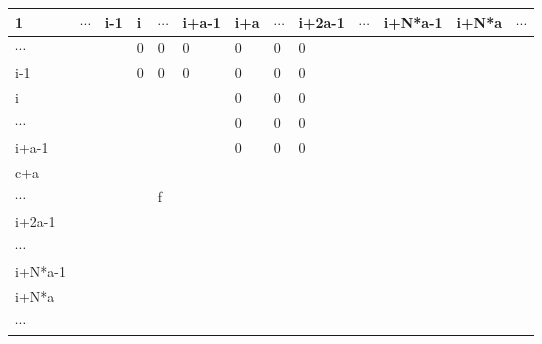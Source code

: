 \documentclass[a4paper,11pt]{article}
\begin{document}
\begin{center}
\begin{tabular}{p{15pt}|p{15pt}|p{15pt}||p{15pt}|p{15pt}
|p{15pt}||p{15pt}|p{15pt}|
p{15pt}|p{15pt}|p{15pt}|p{15pt}|p{15pt}| } 
 1 & $\cdots$ & i-1 & i & $\cdots$ & \tiny{i+a-1} & {\tiny i+a } 
& $\cdots$ & {\tiny{i+2a-1} }
& $\cdots$ & {\tiny i+N*a-1} & {\tiny i+N*a} & $\cdots$ \\
\hline
$\cdots$  & \cellcolor{green} & \cellcolor{green} & \cellcolor{sandstorm} 0 & \cellcolor{sandstorm} 0 & \cellcolor{sandstorm} 0 & \cellcolor{sandstorm} 0 & \cellcolor{sandstorm} 0 & \cellcolor{sandstorm} 0 &  &  &  & \\[10pt]
\hline
i-1 & \cellcolor{green} & \cellcolor{green} & \cellcolor{sandstorm} 0 & \cellcolor{sandstorm} 0 & \cellcolor{sandstorm} 0 & \cellcolor{sandstorm} 0 &\cellcolor{sandstorm} 0 & \cellcolor{sandstorm} 0 &  &  &  &  \\ [10pt]
\hline
i & \cellcolor{periwinkle} & \cellcolor{periwinkle} & \cellcolor{pink} & \cellcolor{pink} &\cellcolor{pink} & \cellcolor{sandstorm} 0 &
\cellcolor{sandstorm} 0 &
\cellcolor{sandstorm} 0 &&&& \\ [10pt]
\hline
$\cdots$ & \cellcolor{periwinkle} & \cellcolor{periwinkle}
&\cellcolor{pink} &\cellcolor{pink}&\cellcolor{pink} &
\cellcolor{sandstorm} 0 & \cellcolor{sandstorm} 0 &
\cellcolor{sandstorm} 0 &&&& \\ [10pt]
\hline
i+a-1 &\cellcolor{periwinkle} &\cellcolor{periwinkle} & \cellcolor{pink} & \cellcolor{pink} & \cellcolor{pink} 
& \cellcolor{sandstorm} 0 & \cellcolor{sandstorm} 0 
& \cellcolor{sandstorm} 0 &&&& \\ [10pt]
\hline \hline
{\scriptsize c+a }  & \cellcolor{periwinkle} & \cellcolor{periwinkle} & \cellcolor{trueblue} &\cellcolor{trueblue}
& \cellcolor{trueblue}& \cellcolor{pink} 
&\cellcolor{pink} & \cellcolor{pink} & &&& \\ [10pt]
\hline
$\cdots$ &\cellcolor{periwinkle} &\cellcolor{periwinkle} & \cellcolor{trueblue}  & \cellcolor{trueblue} f & \cellcolor{trueblue} 
& \cellcolor{pink} & \cellcolor{pink} &\cellcolor{pink} 
&&&& \\ [10pt]
\hline
{\small i+2a-1 } &\cellcolor{periwinkle} & \cellcolor{periwinkle} & \cellcolor{trueblue} 
& \cellcolor{trueblue}  & \cellcolor{trueblue}
& \cellcolor{pink} & \cellcolor{pink} & \cellcolor{pink} 
&&&& \\ [10pt]
\hline
$\cdots$ & &&&&&&&&&&&  \\ [10pt]
\hline
{\tiny i+N*a-1 } & &&&&&&&&&&& \\ [10pt]
\hline
{\tiny i+N*a} & &&&&&&&&&&&\\ [10pt]
\hline
$\cdots$ & &&&&&&&&&&&\\ [10pt]
\hline
\end{tabular}
\end{center}
%
%
%
       
\end{document}
